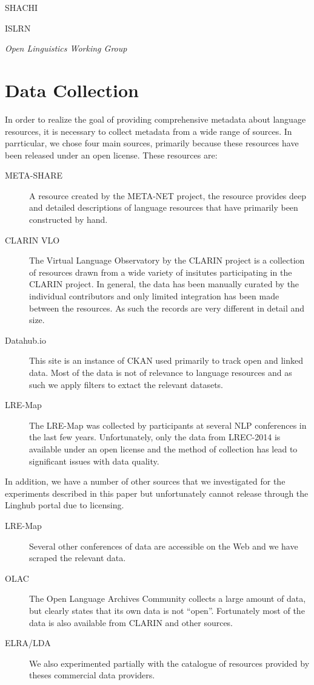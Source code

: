 \documentclass[smallextended]{svjour3}       %
\begin{document}
SHACHI \cite{tohyama2008shachi}

ISLRN \cite{choukri2012using}



\emph{Open Linguistics Working Group}~\cite{chiarcos2012open} 

\section{Data Collection}
\label{data-collection}

In order to realize the goal of providing comprehensive metadata about language
resources, it is necessary to collect metadata from a wide range of sources. In
parrticular, we chose four main sources, primarily because these resources have
been released under an open license. These resources are:

\begin{description}
    \item[META-SHARE] A resource created by the META-NET project,  the resource
        provides deep and detailed descriptions of language resources that have
        primarily been constructed by hand.
    \item[CLARIN VLO] The Virtual Language Observatory by the CLARIN project is
        a collection of resources drawn from a wide variety of insitutes
        participating in the CLARIN project. In general, the data has been
        manually curated by the individual contributors and only limited
        integration has been made between the resources. As such the records are
        very different in detail and size.
    \item[Datahub.io] This site is an instance of CKAN used primarily to track
        open and linked data. Most of the data is not of relevance to language
        resources and as such we apply filters to extact the relevant datasets.
    \item[LRE-Map] The LRE-Map was collected by participants at several NLP
        conferences in the last few years. Unfortunately, only the data from
        LREC-2014 is available under an open license and the method of collection has
        lead to significant issues with data quality.
\end{description}

In addition, we have a number of other sources that we investigated for the
experiments described in this paper but unfortunately cannot release through the
Linghub portal due to licensing.

\begin{description}
    \item[LRE-Map] Several other conferences of data are accessible on the Web
        and we have scraped the relevant data.
    \item[OLAC] The Open Language Archives Community collects a large amount of
        data, but clearly states that its own data is not ``open''. Fortunately
        most of the data is also available from CLARIN and other sources.
    \item[ELRA/LDA] We also experimented partially with the catalogue of
        resources provided by theses commercial data providers.
\end{description}
\end{document}
